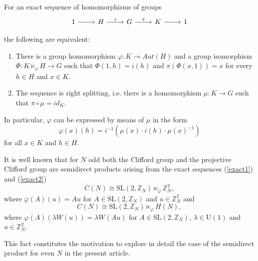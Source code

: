 \documentclass[10pt]{amsart}
\theoremstyle{plain}
\theoremstyle{definition}
\theoremstyle{remark}%
\newcommand{\Z}{\mathbb{Z}}
\newcommand{\SL}{\mathrm{SL}}
\newcommand{\U}{\mathrm{U}}
\begin{document}
 For an exact sequence of homomorphisms of groups 
$$ 
\begin{tikzcd}
1 \arrow{r}{} &H \arrow{r}{i} & G \arrow{r}{\pi}  & K  \arrow{r}{} &1
\end{tikzcd}
$$



the following are equivalent:
\begin{enumerate}
 \item[(i)] There is a group homomorphism $\varphi: K\to Aut(H)$ and a group isomorphism $\Phi: K\ltimes_{\varphi} H \to G$ such that $\Phi(1,h)=i(h)$ and $\pi(\Phi(x,1))=x$ for every $h\in H$ and $x\in K$. 
 \item[(ii)] The sequence is right splitting, i.e. there is a homomorphism $\mu: K\to G$ such that $\pi\circ\mu=id_K$.
\end{enumerate}

In particular, $\varphi$ can be expressed by means of $\mu$ in the form $$\varphi(x)(h)=i^{-1}(\mu(x)\cdot i(h)\cdot \mu(x)^{-1})$$ for all $x\in K$ and $h\in H$.


It is well known \cite{DuttaPrasad,Gross} that for $N$ odd both the Clifford group and the projective Clifford group are semidirect products arising from the exact sequences (\ref{exact1}) and (\ref{exact2})
$$
\overline{C}(N) \cong   \SL(2,\mathbb{Z}_N)\ltimes_{\overline{\varphi}} \mathbb{Z}_N^2 ,
$$
where $\overline{\varphi}(A)(u)=Au$ for $A\in \SL(2,\mathbb{Z}_N)$ and $u\in\Z_{N}^2$
 and
$$
C(N) \cong   \SL(2,\mathbb{Z}_N)\ltimes_{\varphi} H(N) ,
$$
where $\varphi(A)(\lambda W(u))=\lambda W(Au)$ for $A\in \SL(2,\mathbb{Z}_N)$, $\lambda\in \U(1)$ and $u\in\Z_{N}^2$.



This fact constitutes the motivation
to explore in detail the case of the semidirect product 
for even $N$ in the present article. 


\end{document}
